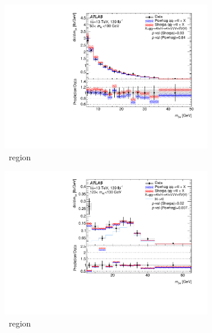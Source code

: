 \begin{figure}[htb!]
    \begin{subfigure}{.49\textwidth}\centering
      \includegraphics[width=.99\linewidth]{Figures/m4l/UnfoldedResults/linY_Unfolded_Data_m34_m4l60-100.pdf}\caption{\ZFourL \ region}\label{fig:sub-first}
    \end{subfigure}
    \begin{subfigure}{.49\textwidth}\centering
      \includegraphics[width=.99\linewidth]{Figures/m4l/UnfoldedResults/higgs_linY_Unfolded_Data_m34_m4l120-130.pdf} \caption{\HFourL \ region}\label{fig:sub-second}
    \end{subfigure}
    \begin{subfigure}{.49\textwidth}\centering

\end{subfigure}
\end{figure}

